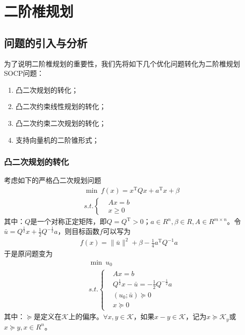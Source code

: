 
\chapter{二阶椎规划}
\section{问题的引入与分析}
    \par
    为了说明二阶椎规划的重要性，我们先将如下几个优化问题转化为二阶椎规划SOCP问题：
    \begin{enumerate}
    \item 凸二次规划的转化；
    \item 凸二次约束线性规划的转化；
    \item 凸二次约束二次规划的转化；
    \item 支持向量机的二阶锥形式；
    \end{enumerate}
    \subsection{凸二次规划的转化}
        \par
        考虑如下的严格凸二次规划问题
        \begin{align*}
          & \mathop{\min}\  f(x) = x^\mathrm{T} Qx+a^\mathrm{T} x+\beta\\
          & s.t.\left\{
            \begin{aligned}
             &Ax=b\\
             &x \geqslant 0
            \end{aligned}
             \right.
        \end{align*}
        其中：$Q$是一个对称正定矩阵，即$Q=Q^\mathrm{T}>0$；$a \in R^n,\beta \in R,A\in R^{m\times n}$。令$\bar{u}=Q^{\frac 12}x+{\frac 12}Q^{-\frac 12}a$，则目标函数$f$可以写为
        \begin{align*}
          f(x) = \|\bar{u}\|^2+\beta-\frac 14a^\mathrm{T} Q^{-1}a
        \end{align*}
        于是原问题变为
        \begin{align*}
          & \mathop{\min} \  u_0\\
          & s.t.\left\{
            \begin{aligned}
             &Ax=b\\
             &Q^{\frac 12}x-\bar{u}=-\frac 12 Q^{-\frac 12}a\\
             &(u_0;\bar{u}) \succeq 0\\
             &x \succeq 0
            \end{aligned}
             \right.
        \end{align*}
        其中：$\succeq$是定义在$\mathcal{K}$上的偏序。$\forall x,y \in \mathcal{K}$，如果$x - y \in \mathcal{K}$，记为$x \succeq \mathcal{K}_y$或$x \succeq y,x \in R^n$。
